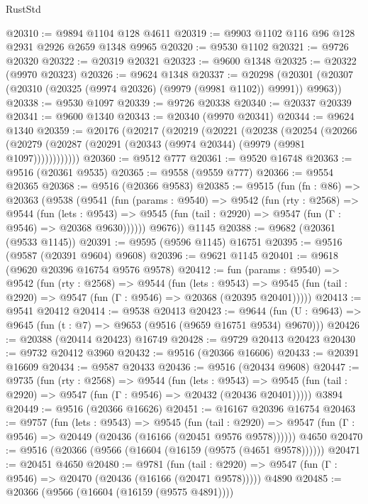 \begin{lexlean}{RustStd}
\begin{coremodule}
@20310 := @9894 @1104 @128 @4611
@20319 := @9903 @1102 @116 @96 @128 @2931 @2926 @2659 @1348 @9965
@20320 := @9530 @1102
@20321 := @9726 @20320
@20322 := @20319 @20321
@20323 := @9600 @1348
@20325 := @20322 (@9970 @20323)
@20326 := @9624 @1348
@20337 := @20298
    (@20301 (@20307 (@20310 (@20325 (@9974 @20326) (@9979 (@9981 @1102)) @9991)) @9963))
@20338 := @9530 @1097
@20339 := @9726 @20338
@20340 := @20337 @20339
@20341 := @9600 @1340
@20343 := @20340 (@9970 @20341)
@20344 := @9624 @1340
@20359 := @20176
    (@20217
      (@20219
        (@20221
          (@20238
            (@20254
              (@20266 (@20279 (@20287 (@20291 (@20343 (@9974 @20344) (@9979 (@9981 @1097))))))))))))
@20360 := @9512 @777
@20361 := @9520 @16748
@20363 := @9516 (@20361 @9535)
@20365 := @9558 (@9559 @777)
@20366 := @9554 @20365
@20368 := @9516 (@20366 @9583)
@20385 := @9515
    (fun (fn : @86) =>
    @20363
      (@9538
        (@9541
          (fun (params : @9540) =>
          @9542
            (fun (rty : @2568) =>
            @9544
              (fun (lets : @9543) =>
              @9545 (fun (tail : @2920) => @9547 (fun (Γ : @9546) => @20368 @9630))))))
        @9676))
    @1145
@20388 := @9682 (@20361 (@9533 @1145))
@20391 := @9595 (@9596 @1145) @16751
@20395 := @9516 (@9587 (@20391 @9604) @9608)
@20396 := @9621 @1145
@20401 := @9618 (@9620 @20396 @16754 @9576 @9578)
@20412 := fun (params : @9540) =>
  @9542
    (fun (rty : @2568) =>
    @9544
      (fun (lets : @9543) =>
      @9545 (fun (tail : @2920) => @9547 (fun (Γ : @9546) => @20368 (@20395 @20401)))))
@20413 := @9541 @20412
@20414 := @9538 @20413
@20423 := @9644
    (fun (U : @9643) => @9645 (fun (t : @7) => @9653 (@9516 (@9659 @16751 @9534) @9670)))
@20426 := @20388 (@20414 @20423) @16749
@20428 := @9729 @20413 @20423
@20430 := @9732 @20412 @3960
@20432 := @9516 (@20366 @16606)
@20433 := @20391 @16609
@20434 := @9587 @20433
@20436 := @9516 (@20434 @9608)
@20447 := @9735
    (fun (rty : @2568) =>
    @9544
      (fun (lets : @9543) =>
      @9545 (fun (tail : @2920) => @9547 (fun (Γ : @9546) => @20432 (@20436 @20401)))))
    @3894
@20449 := @9516 (@20366 @16626)
@20451 := @16167 @20396 @16754
@20463 := @9757
    (fun (lets : @9543) =>
    @9545
      (fun (tail : @2920) =>
      @9547 (fun (Γ : @9546) => @20449 (@20436 (@16166 (@20451 @9576 @9578))))))
    @4650
@20470 := @9516 (@20366 (@9566 (@16604 (@16159 (@9575 (@4651 @9578))))))
@20471 := @20451 @4650
@20480 := @9781
    (fun (tail : @2920) => @9547 (fun (Γ : @9546) => @20470 (@20436 (@16166 (@20471 @9578)))))
    @4890
@20485 := @20366 (@9566 (@16604 (@16159 (@9575 @4891))))

\end{coremodule}
\end{lexlean}
